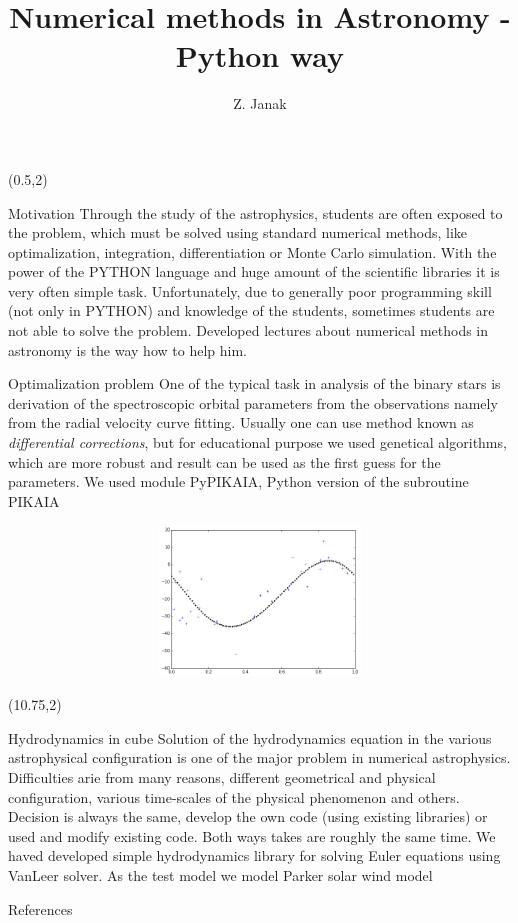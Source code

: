 \documentclass[unknownkeysallowed]{beamer}
\title{Numerical methods in Astronomy - Python way}
\author{Z. Janak}
\date{}
\begin{document}
\begin{frame}{} 

\begin{textblock}{9.75}(0.5,2)
\begin{block}{Motivation}
Through the study of the astrophysics, students are often exposed to the problem,
which must be solved using standard numerical methods, like optimalization, integration,
differentiation or Monte Carlo simulation. With the power of the PYTHON language and 
huge amount of the scientific libraries it is very often simple task. Unfortunately,
due to generally poor programming skill (not only in PYTHON) and knowledge of the students, 
sometimes students are not able to solve the problem. Developed lectures about numerical
 methods in astronomy is the way how to help him.
\end{block}

\begin{block}{Optimalization problem}
One of the typical task in analysis of the binary stars is derivation of the spectroscopic orbital parameters from the observations namely from the radial velocity curve fitting. Usually one can use method known as {\it differential corrections}, but for educational purpose we used genetical algorithms, which are more robust and result can be used as the first guess for the parameters. We used module PyPIKAIA, Python version
of the subroutine PIKAIA 
\begin{figure}
\includegraphics[width=1\textwidth, height=4cm]{radialvelocity.png}
\end{figure}
\end{block}
\end{textblock}

\begin{textblock}{9.5}(10.75,2)
\begin{block}{Hydrodynamics in cube}
Solution of the hydrodynamics equation in the various astrophysical configuration is one of the 
major problem in numerical astrophysics. Difficulties arie from many reasons, different geometrical and physical configuration,
various time-scales of the physical phenomenon and others. Decision is always the same, develop the own code (using existing libraries)
or used and modify existing code. Both ways takes are roughly the same time. We haved developed simple hydrodynamics library for solving Euler equations using VanLeer solver. As the test model we model Parker solar wind model \cite{Parker1958}
\end{block}

\begin{block}{References}


\end{block}
\end{textblock}

\end{frame}
\end{document}
